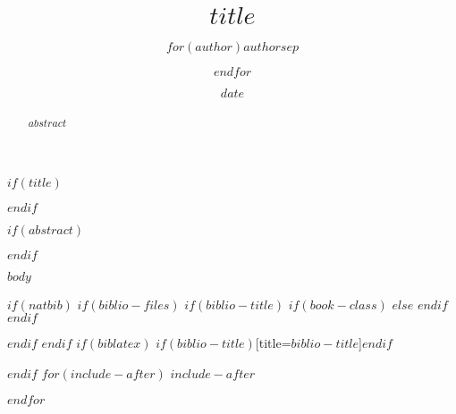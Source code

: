 \documentclass{tufte-handout}
\title{$title$}
\author{$for(author)$$author$$sep$ \and $endfor$}
\date{$date$}
\begin{document}
$if(title)$
\maketitle
$endif$

\bigskip

$if(abstract)$
\begin{abstract}
$abstract$
\end{abstract}
$endif$

$body$

$if(natbib)$
$if(biblio-files)$
$if(biblio-title)$
$if(book-class)$
\renewcommand\bibname{$biblio-title$}
$else$
\renewcommand\refname{$biblio-title$}
$endif$
$endif$



$endif$
$endif$
$if(biblatex)$
\printbibliography$if(biblio-title)$[title=$biblio-title$]$endif$

$endif$
$for(include-after)$
$include-after$

$endfor$
\end{document}
